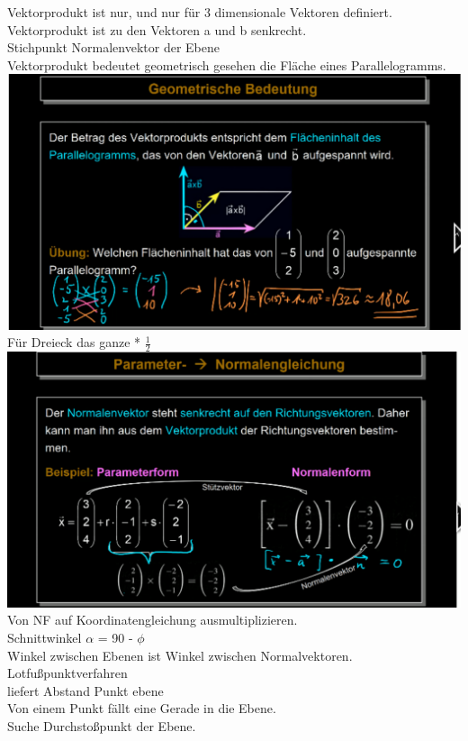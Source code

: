 \documentclass{article}
\begin{document}
	Vektorprodukt ist nur, und nur für 3 dimensionale Vektoren definiert. \\
	Vektorprodukt ist zu den Vektoren a und b senkrecht. \\
	Stichpunkt Normalenvektor der Ebene \\
	Vektorprodukt bedeutet geometrisch gesehen die Fläche eines Parallelogramms. \\
	\includegraphics[width=\linewidth]{GVP} \\
	Für Dreieck das ganze * $\frac{1}{2}$ \\
	\includegraphics[width=\linewidth]{wechsel}
	Von NF auf Koordinatengleichung ausmultiplizieren. \\
	Schnittwinkel $\alpha$ = 90 - $\phi$ \\
	Winkel zwischen Ebenen ist Winkel zwischen Normalvektoren. \\
	Lotfußpunktverfahren \\
	liefert Abstand Punkt ebene \\
	Von einem Punkt fällt eine Gerade in die Ebene. \\
	Suche Durchstoßpunkt der Ebene. \\
\end{document}
